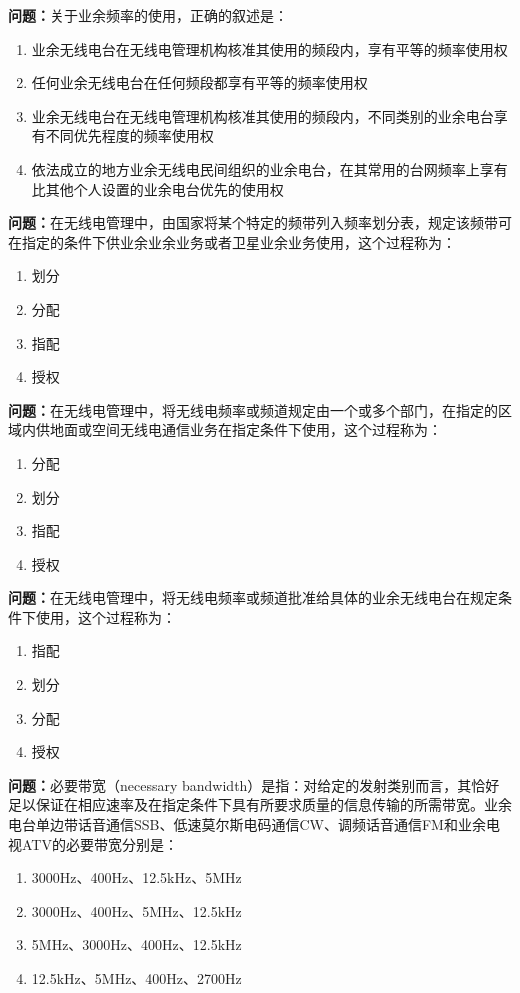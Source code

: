 \bigskip


\noindent\textbf{问题：}关于业余频率的使用，正确的叙述是：
\begin{enumerate}[label=\Alph*), leftmargin=3em]
\item 业余无线电台在无线电管理机构核准其使用的频段内，享有平等的频率使用权
\item 任何业余无线电台在任何频段都享有平等的频率使用权
\item 业余无线电台在无线电管理机构核准其使用的频段内，不同类别的业余电台享有不同优先程度的频率使用权
\item 依法成立的地方业余无线电民间组织的业余电台，在其常用的台网频率上享有比其他个人设置的业余电台优先的使用权
\end{enumerate}

\bigskip


\noindent\textbf{问题：}在无线电管理中，由国家将某个特定的频带列入频率划分表，规定该频带可在指定的条件下供业余业余业务或者卫星业余业务使用，这个过程称为：
\begin{enumerate}[label=\Alph*), leftmargin=3em]
\item 划分
\item 分配
\item 指配
\item 授权
\end{enumerate}

\bigskip


\noindent\textbf{问题：}在无线电管理中，将无线电频率或频道规定由一个或多个部门，在指定的区域内供地面或空间无线电通信业务在指定条件下使用，这个过程称为：
\begin{enumerate}[label=\Alph*), leftmargin=3em]
\item 分配
\item 划分
\item 指配
\item 授权
\end{enumerate}

\bigskip


\noindent\textbf{问题：}在无线电管理中，将无线电频率或频道批准给具体的业余无线电台在规定条件下使用，这个过程称为：
\begin{enumerate}[label=\Alph*), leftmargin=3em]
\item 指配
\item 划分
\item 分配
\item 授权
\end{enumerate}

\bigskip


\noindent\textbf{问题：}必要带宽（necessary bandwidth）是指：对给定的发射类别而言，其恰好足以保证在相应速率及在指定条件下具有所要求质量的信息传输的所需带宽。业余电台单边带话音通信SSB、低速莫尔斯电码通信CW、调频话音通信FM和业余电视ATV的必要带宽分别是：
\begin{enumerate}[label=\Alph*), leftmargin=3em]
\item 3000Hz、400Hz、12.5kHz、5MHz
\item 3000Hz、400Hz、5MHz、12.5kHz
\item 5MHz、3000Hz、400Hz、12.5kHz
\item 12.5kHz、5MHz、400Hz、2700Hz
\end{enumerate}

